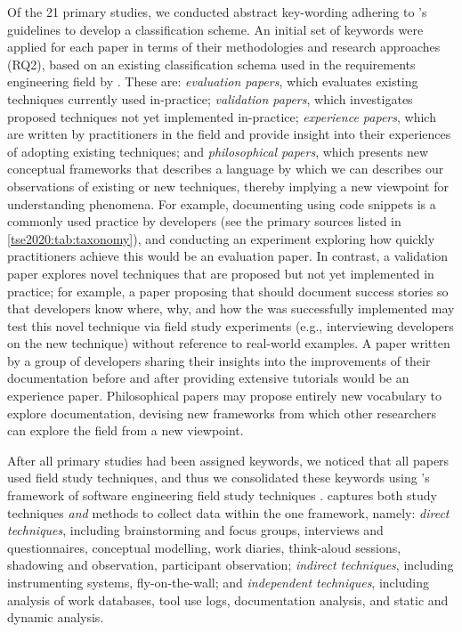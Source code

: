 Of the 21 primary studies, we conducted abstract key-wording adhering to \citeauthor{Petersen:2008td}'s guidelines \citep{Petersen:2008td} to develop a classification scheme.
An initial set of keywords were applied for each paper in terms of their methodologies and research approaches (RQ2), based on an existing classification schema used in the requirements engineering field by \citet{Wieringa:2006vd}. These are: \textit{evaluation papers}, which evaluates existing techniques currently used in-practice; \textit{validation papers}, which investigates proposed techniques not yet implemented in-practice; \textit{experience papers}, which are written by practitioners in the field and provide insight into their experiences of adopting existing techniques; and \textit{philosophical papers}, which presents new conceptual frameworks that describes a language by which we can describes our observations of existing or new techniques, thereby implying a new viewpoint for understanding phenomena. For example, documenting  using code snippets is a commonly used practice by developers (see the primary sources listed in \cref{tse2020:tab:taxonomy}), and conducting an experiment exploring how quickly practitioners achieve this would be an evaluation paper. In contrast, a validation paper explores novel techniques that are proposed but not yet implemented in practice; for example, a paper proposing that  should document success stories so that developers know where, why, and how the  was successfully implemented may test this novel technique via field study experiments (e.g., interviewing developers on the new technique) without reference to real-world examples. A paper written by a group of developers sharing their insights into the improvements of their documentation before and after providing extensive tutorials would be an experience paper. Philosophical papers may propose entirely new vocabulary to explore  documentation, devising new frameworks from which other researchers can explore the field from a new viewpoint.

After all primary studies had been assigned keywords, we noticed that all papers used field study techniques, and thus we consolidated these keywords using \citeauthor{Singer:2007tu}'s framework of software engineering field study techniques \citep{Singer:2007tu}. \citeauthor{Singer:2007tu} captures both study techniques \textit{and} methods to collect data within the one framework, namely: \textit{direct techniques}, including brainstorming and focus groups, interviews and questionnaires, conceptual modelling, work diaries, think-aloud sessions, shadowing and observation, participant observation; \textit{indirect techniques}, including instrumenting systems, fly-on-the-wall; and \textit{independent techniques}, including analysis of work databases, tool use logs, documentation analysis, and static and dynamic analysis.

